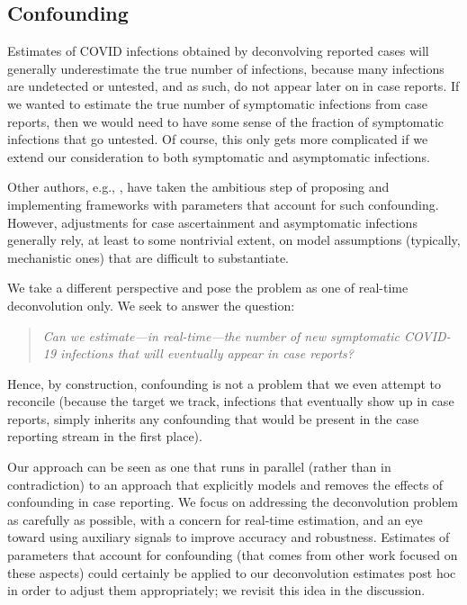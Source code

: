 \documentclass[sts]{imsart}
\theoremstyle{plain}
\theoremstyle{definition}
\theoremstyle{remark}
\begin{document}
\subsection{Confounding}
\label{sec:confounding}

Estimates of COVID infections obtained by deconvolving reported cases will
generally underestimate the true number of infections, because many infections
are undetected or untested, and as such, do not appear later on in case
reports. If we wanted to estimate the true number of symptomatic infections
from case reports, then we would need to have some sense of the fraction of 
symptomatic infections that go untested. Of course, this only gets more
complicated if we extend our consideration to both symptomatic and asymptomatic
infections.  

Other authors, e.g., \citet{Chitwood:2021}, have taken the ambitious step of
proposing and implementing frameworks with parameters that account for such
confounding. However, adjustments for case ascertainment and asymptomatic
infections generally rely, at least to some nontrivial extent, on model
assumptions (typically, mechanistic ones) that are difficult to substantiate.

We take a different perspective and pose the problem as one of real-time 
deconvolution only. We seek to answer the question:   
\begin{quote}
\it
Can we estimate---in real-time---the number of new symptomatic COVID-19
infections that will eventually appear in case reports?  
\end{quote}
Hence, by construction, confounding is not a problem that we even attempt   
to reconcile (because the target we track, infections that eventually show up
in case reports, simply inherits any confounding that would be present in the
case reporting stream in the first place). 

Our approach can be seen as one that runs in parallel (rather than in
contradiction) to an approach that explicitly models and removes the effects of
confounding in case reporting. We focus on addressing the deconvolution problem
as carefully as possible, with a concern for real-time estimation, and an eye
toward using auxiliary signals to improve accuracy and robustness. Estimates of
parameters that account for confounding (that comes from other work focused on  
these aspects) could certainly be applied to our deconvolution estimates post
hoc in order to adjust them appropriately; we revisit this idea in the
discussion. 
\end{document}
